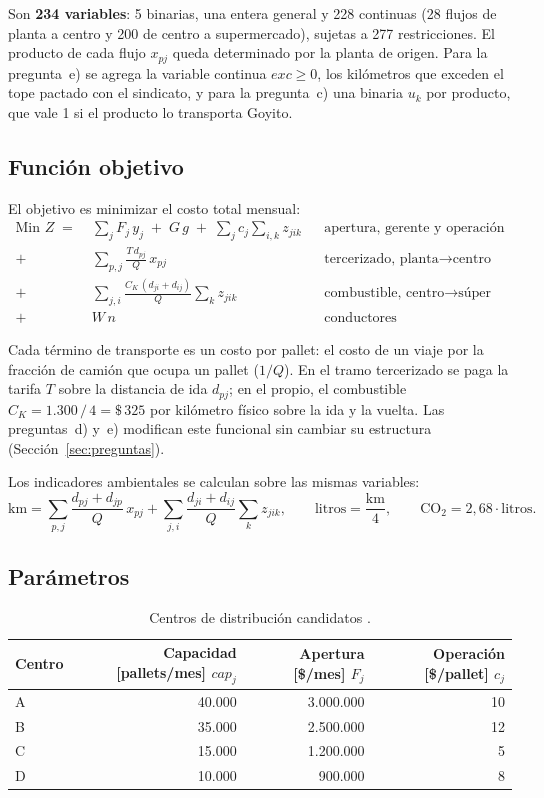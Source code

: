 \documentclass[10pt,a4paper]{article}
\begin{document}
Son \textbf{234 variables}: 5 binarias, una entera general y 228 continuas
(28 flujos de planta a centro y 200 de centro a supermercado), sujetas a 277
restricciones. El producto de cada flujo $x_{pj}$ queda determinado por la
planta de origen. Para la pregunta~e) se agrega la variable continua
$\mathit{exc} \geq 0$, los kilómetros que exceden el tope pactado con el
sindicato, y para la pregunta~c) una binaria $u_k$ por producto, que vale 1 si
el producto lo transporta Goyito.

\subsection{Función objetivo}
\label{sec:objetivo}

El objetivo es minimizar el costo total mensual:
\[
\begin{aligned}
\text{Min } Z \;=\; & \sum_{j} F_j\, y_j \;+\; G\, g \;+\; \sum_{j} c_j \sum_{i,k} z_{jik}
&& \text{apertura, gerente y operación} \\
+\; & \sum_{p,j} \frac{T\, d_{pj}}{Q}\, x_{pj}
&& \text{tercerizado, planta} \to \text{centro} \\
+\; & \sum_{j,i} \frac{C_K\,(d_{ji}+d_{ij})}{Q} \sum_k z_{jik}
&& \text{combustible, centro} \to \text{súper} \\
+\; & W\, n
&& \text{conductores}
\end{aligned}
\]

Cada término de transporte es un costo por pallet: el costo de un viaje por la
fracción de camión que ocupa un pallet ($1/Q$). En el tramo tercerizado se
paga la tarifa $T$ sobre la distancia de ida $d_{pj}$; en el propio, el
combustible $C_K = 1.300\,/\,4 = \$\,325$ por kilómetro físico sobre la ida y
la vuelta. Las preguntas~d) y~e) modifican este funcional sin cambiar su
estructura (Sección~\ref{sec:preguntas}).

Los indicadores ambientales se calculan sobre las mismas variables:
\[
\text{km} = \sum_{p,j} \frac{d_{pj}+d_{jp}}{Q}\, x_{pj} + \sum_{j,i} \frac{d_{ji}+d_{ij}}{Q}\sum_k z_{jik},
\qquad
\text{litros} = \frac{\text{km}}{4},
\qquad
\text{CO}_2 = 2{,}68 \cdot \text{litros}.
\]

\subsection{Parámetros}
\label{sec:parametros}

\begin{table}[H]
\centering\small
\caption{Centros de distribución candidatos \cite{consigna}.}
\label{tab:centros}
\begin{tabular}{lrrr}
\toprule
\textbf{Centro} & \textbf{Capacidad [pallets/mes]} $\mathit{cap}_j$ & \textbf{Apertura [\$/mes]} $F_j$ & \textbf{Operación [\$/pallet]} $c_j$ \\
\midrule
A & 40.000 & 3.000.000 & 10 \\
B & 35.000 & 2.500.000 & 12 \\
C & 15.000 & 1.200.000 & 5 \\
D & 10.000 & 900.000 & 8 \\
\bottomrule
\end{tabular}
\end{table}
\end{document}
